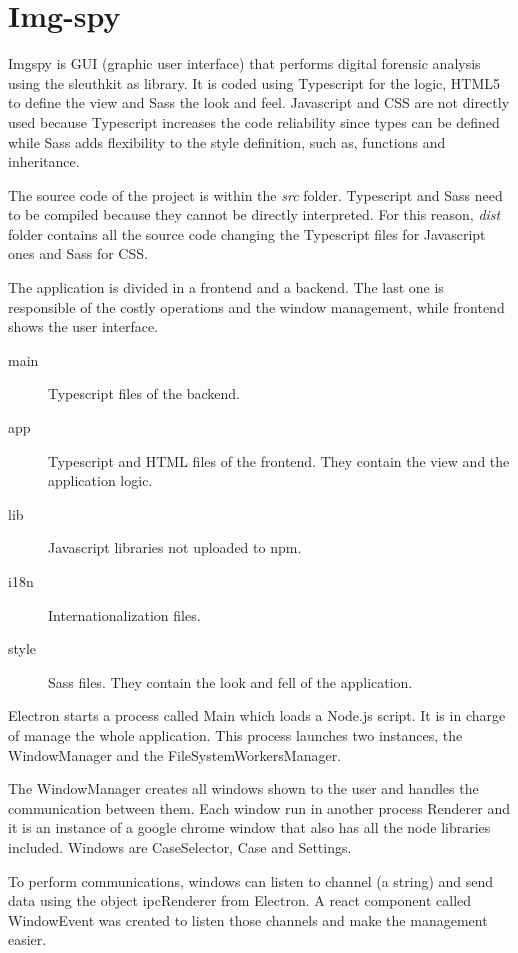 \chapter{Img-spy}
\label{S:img-spy}

Imgspy is GUI (graphic user interface) that performs digital forensic analysis
using the sleuthkit as library. It is coded using Typescript for the logic,
HTML5 to define the view and Sass the look and feel. Javascript and CSS are not 
directly used because Typescript increases the code reliability since types 
can be defined while Sass adds flexibility to the style definition, such as, functions and inheritance.

The source code of the project is within the \textit{src} folder. Typescript
and Sass need to be compiled because they cannot be directly interpreted. For
this reason, \textit{dist} folder contains all the source code changing the 
Typescript files for Javascript ones and Sass for CSS.

The application is divided in a frontend and a backend. The last one is 
responsible of the costly operations and the window management, while frontend
shows the user interface.

\begin{description}
	\item[main] Typescript files of the backend.
	\item[app] Typescript and HTML files of the frontend. They contain the view
	and the application logic.
	\item[lib] Javascript libraries not uploaded to npm.
	\item[i18n] Internationalization files.
	\item[style] Sass files. They contain the look and fell of the application.
\end{description}


Electron starts a process called Main which loads a Node.js script. It is in
charge of manage the whole application. This process launches two instances, the
WindowManager and the FileSystemWorkersManager.

The WindowManager creates all windows shown to the user and handles the
communication between them. Each window run in another process Renderer and it
is an instance of a google chrome window that also has all the  node libraries
included. Windows are CaseSelector, Case and Settings.

To perform communications, windows can listen to channel (a string) and send
data using the object ipcRenderer from Electron. A react component called
WindowEvent was created to listen those channels and make the management easier.

